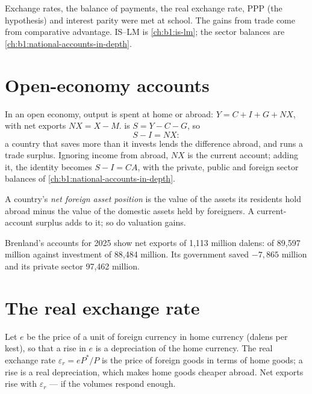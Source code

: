 \begin{recall}
Exchange rates, the balance of payments, the real exchange rate,
PPP (the hypothesis) and interest parity were met at school. The
gains from trade come from comparative advantage. IS--LM is
\cref{ch:b1:is-lm}; the sector balances are \cref{ch:b1:national-accounts-in-depth}.
\end{recall}

\section{Open-economy accounts}\label{sec:b1:open-economy:accounts}

In an open economy, output is spent at home or abroad:
$Y = C + I + G + NX$, with net exports $NX = X - M$.  is $S = Y - C - G$,
so
\[
S - I = NX :
\]
a country that saves more than it invests lends the difference abroad, and
runs a trade surplus. Ignoring income from abroad, $NX$ is the current
account; adding it, the identity becomes $S - I = CA$, with the private,
public and foreign sector balances of \cref{ch:b1:national-accounts-in-depth}.

\begin{definition}\label{def:b1:open-economy:nfa}
A country's \emph{net foreign asset position} is the value of the assets its
residents hold abroad minus the value of the domestic assets held by
foreigners. A current-account surplus adds to it; so do valuation gains.
\end{definition}

Brenland's accounts for 2025 show net exports of 1,113 million dalens:
 of 89,597 million against investment of 88,484 million. Its
government saved $-7{,}865$ million and its private sector 97,462 million. %

\section{The real exchange rate}\label{sec:b1:open-economy:real}

Let $e$ be the price of a unit of foreign currency in home currency (dalens
per kest), so that a rise in $e$ is a depreciation of the home currency. The
real exchange rate $\varepsilon_r = eP^*/P$ is the price of foreign goods in terms of home
goods; a rise is a real depreciation, which makes home goods cheaper
abroad. Net exports rise with $\varepsilon_r$ --- if the volumes respond enough.


